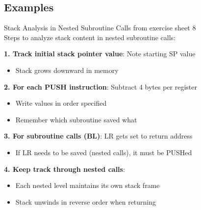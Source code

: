 \subsection{Examples}











\begin{KR}{Stack Analysis in Nested Subroutine Calls} from exercise sheet 8\\
Steps to analyze stack content in nested subroutine calls:

\textbf{1. Track initial stack pointer value}: Note starting SP value
\begin{itemize}
  \item Stack grows downward in memory
\end{itemize}

\textbf{2. For each PUSH instruction}: Subtract 4 bytes per register
\begin{itemize}
  \item Write values in order specified
  \item Remember which subroutine saved what
\end{itemize}

\textbf{3. For subroutine calls (BL)}: LR gets set to return address
\begin{itemize}
  \item If LR needs to be saved (nested calls), it must be PUSHed
\end{itemize}

\textbf{4. Keep track through nested calls}:
\begin{itemize}
  \item Each nested level maintains its own stack frame
  \item Stack unwinds in reverse order when returning
\end{itemize}
\end{KR}

